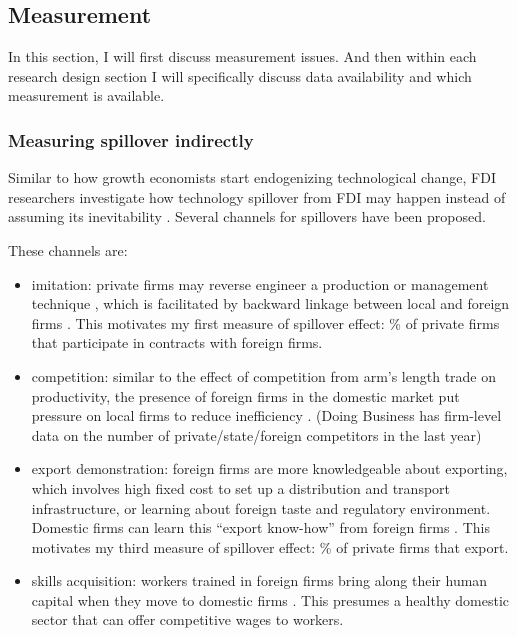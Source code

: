 \subsection{Measurement}

In this section, I will first discuss measurement issues. And then within each research design section I will specifically discuss data availability and which measurement is available.

\subsubsection{Measuring spillover indirectly}

Similar to how growth economists start endogenizing technological change, FDI researchers investigate how technology spillover from FDI may happen instead of assuming its inevitability \citep{Romer1994}. Several channels for spillovers have been proposed.

These channels are:
\begin{itemize}
	\item imitation:  private firms may reverse engineer a production or management technique \citep{Wang1992}, which is facilitated by backward linkage between local and foreign firms \citep{Javorcik2004}. This motivates my first measure of spillover effect: \% of private firms that participate in contracts with foreign firms.
	\item competition: similar to the effect of competition from arm's length trade on productivity, the presence of foreign firms in the domestic market put pressure on local firms to reduce inefficiency \citep{Glass2002}. (Doing Business has firm-level data on the number of private/state/foreign competitors in the last year)
	\item export demonstration: foreign firms are more knowledgeable about exporting, which involves high fixed cost to set up a distribution and transport infrastructure, or learning about foreign taste and regulatory environment. Domestic firms can learn this ``export know-how'' from foreign firms \citep{Aitken1997}. This motivates my third measure of spillover effect: \% of private firms that export.
	\item skills acquisition: workers trained in foreign firms bring along their human capital when they move to domestic firms \citep{Djankov2000}. This presumes a healthy domestic sector that can offer competitive wages to workers.
\end{itemize}

